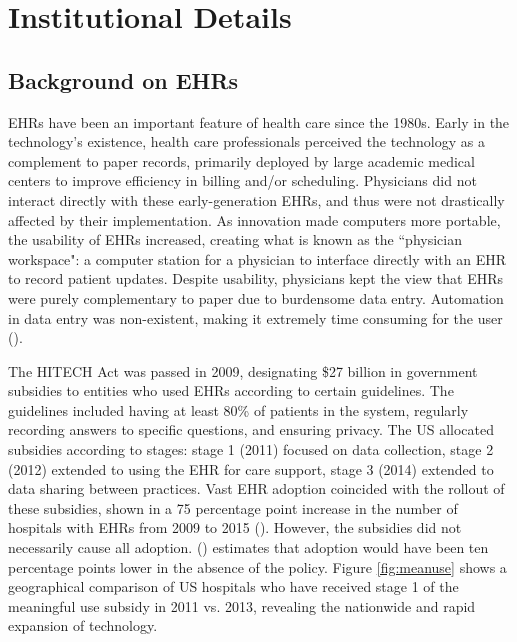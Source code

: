 \documentclass[12pt]{article}
\begin{document}
\section{Institutional Details}

\subsection{Background on EHRs}
EHRs have been an important feature of health care since the 1980s. Early in the technology's existence, health care professionals perceived the technology as a complement to paper records, primarily deployed by large academic medical centers to improve efficiency in billing and/or scheduling. Physicians did not interact directly with these early-generation EHRs, and thus were not drastically affected by their implementation. As innovation made computers more portable, the usability of EHRs increased, creating what is known as the ``physician workspace": a computer station for a physician to interface directly with an EHR to record patient updates. Despite usability, physicians kept the view that EHRs were purely complementary to paper due to burdensome data entry. Automation in data entry was non-existent, making it extremely time consuming for the user (\cite{evans2016electronic}). 

The HITECH Act was passed in 2009, designating \$27 billion in government subsidies to entities who used EHRs according to certain guidelines. The guidelines included having at least 80\% of patients in the system, regularly recording answers to specific questions, and ensuring privacy. The US allocated subsidies according to stages: stage 1 (2011) focused on data collection, stage 2 (2012) extended to using the EHR for care support, stage 3 (2014) extended to data sharing between practices. Vast EHR adoption coincided with the rollout of these subsidies, shown in a 75 percentage point increase in the number of hospitals with EHRs from 2009 to 2015 (\cite{stats}). However, the subsidies did not necessarily cause all adoption. \citeauthor{dranove2015investment} (\citeyear{dranove2015investment}) estimates that adoption would have been ten percentage points lower in the absence of the policy. Figure \ref{fig:meanuse} shows a geographical comparison of US hospitals who have received stage 1 of the meaningful use subsidy in 2011 vs. 2013, revealing the nationwide and rapid expansion of technology. 
\end{document}
